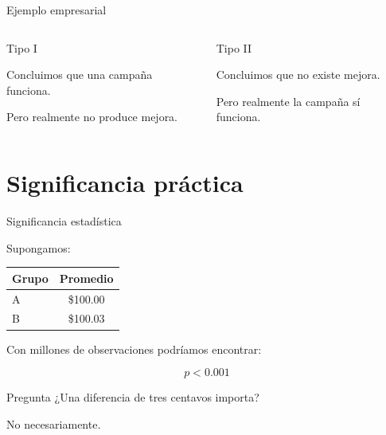 \documentclass[aspectratio=169,11pt]{beamer}
\begin{document}
\begin{frame}{Ejemplo empresarial}

\begin{columns}


\begin{alertblock}{Tipo I}

Concluimos que una campaña funciona.

Pero realmente no produce mejora.

\end{alertblock}


\begin{exampleblock}{Tipo II}

Concluimos que no existe mejora.

Pero realmente la campaña sí funciona.

\end{exampleblock}

\end{columns}

\end{frame}

\section{Significancia práctica}

\begin{frame}{Significancia estadística}

Supongamos:

\begin{center}

\begin{tabular}{lc}
\toprule

Grupo &
Promedio \\

\midrule

A &
\$100.00 \\

B &
\$100.03 \\

\bottomrule

\end{tabular}

\end{center}

Con millones de observaciones podríamos encontrar:

\[
p < 0.001
\]

\begin{alertblock}{Pregunta}
¿Una diferencia de tres centavos importa?
\end{alertblock}

No necesariamente.

\end{frame}
\end{document}
